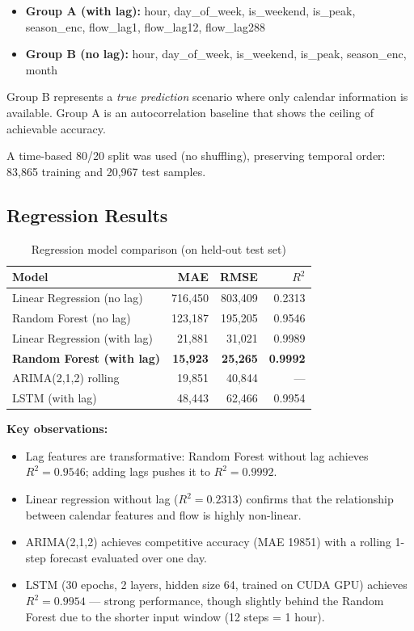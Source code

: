 \documentclass[12pt,a4paper]{article}
\begin{document}
\begin{itemize}
    \item \textbf{Group A (with lag):} hour, day\_of\_week, is\_weekend, is\_peak, season\_enc, flow\_lag1, flow\_lag12, flow\_lag288
    \item \textbf{Group B (no lag):} hour, day\_of\_week, is\_weekend, is\_peak, season\_enc, month
\end{itemize}

Group B represents a \emph{true prediction} scenario where only calendar information is available. Group A is an autocorrelation baseline that shows the ceiling of achievable accuracy.

A time-based 80/20 split was used (no shuffling), preserving temporal order: 83,865 training and 20,967 test samples.

\subsection{Regression Results}

\begin{table}[H]
\centering
\caption{Regression model comparison (on held-out test set)}
\begin{tabular}{lrrr}
\toprule
\textbf{Model} & \textbf{MAE} & \textbf{RMSE} & \textbf{$R^2$} \\
\midrule
Linear Regression (no lag)       & 716,450  & 803,409  & 0.2313 \\
Random Forest (no lag)           & 123,187  & 195,205  & 0.9546 \\
Linear Regression (with lag)     & 21,881   & 31,021   & 0.9989 \\
\textbf{Random Forest (with lag)}& \textbf{15,923} & \textbf{25,265} & \textbf{0.9992} \\
ARIMA(2,1,2) rolling             & 19,851   & 40,844   & — \\
LSTM (with lag)                  & 48,443   & 62,466   & 0.9954 \\
\bottomrule
\end{tabular}
\end{table}

\textbf{Key observations:}
\begin{itemize}
    \item Lag features are transformative: Random Forest without lag achieves $R^2 = 0.9546$; adding lags pushes it to $R^2 = 0.9992$.
    \item Linear regression without lag ($R^2 = 0.2313$) confirms that the relationship between calendar features and flow is highly non-linear.
    \item ARIMA(2,1,2) achieves competitive accuracy (MAE \num{19851}) with a rolling 1-step forecast evaluated over one day.
    \item LSTM (30 epochs, 2 layers, hidden size 64, trained on CUDA GPU) achieves $R^2 = 0.9954$ — strong performance, though slightly behind the Random Forest due to the shorter input window (12 steps = 1 hour).
\end{itemize}
\end{document}
